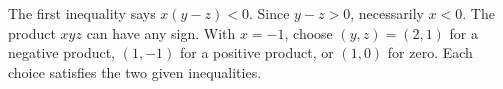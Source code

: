 The first inequality says $ x(y-z)<0 $. Since $ y-z>0 $, necessarily $ x<0 $. The product $ xyz $ can have any sign. With $ x=-1 $, choose $(y,z)=(2,1)$ for a negative product, $(1,-1)$ for a positive product, or $(1,0)$ for zero. Each choice satisfies the two given inequalities.
